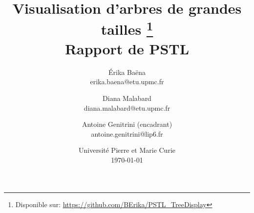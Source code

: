 \documentclass[a4paper,oneside]{report}
\title{Visualisation d'arbres de grandes tailles \footnote{Disponible sur: \url{https://github.com/BErika/PSTL_TreeDisplay}}\\ Rapport de PSTL}
\author{Érika Baëna\\ erika.baena@etu.upmc.fr \and Diana Malabard\\ diana.malabard@etu.upmc.fr \and Antoine Genitrini (encadrant)\\ antoine.genitrini@lip6.fr}
\date{Université Pierre et Marie Curie\\ \today}
\begin{document}
\maketitle
\tableofcontents

%


\abstract{} %






\appendix




\nocite{*}


\end{document}
